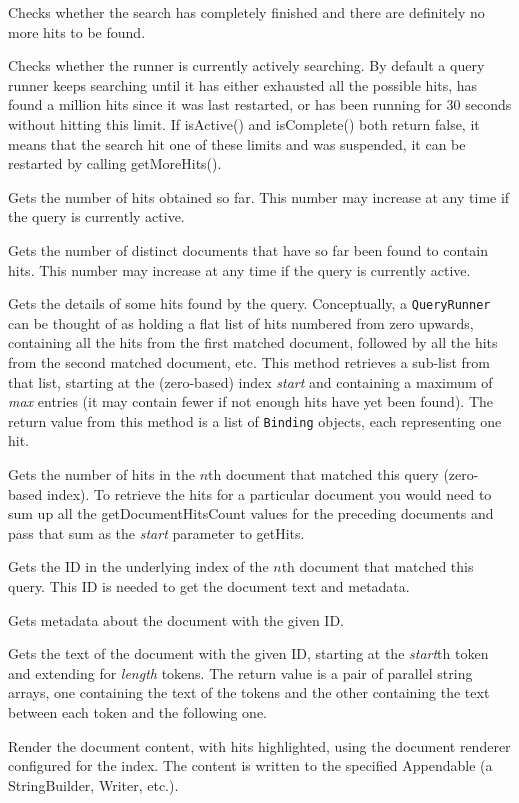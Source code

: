 \bde
\item[isComplete()] Checks whether the search has completely finished and there
  are definitely no more hits to be found.
\item[isActive()] Checks whether the runner is currently actively searching.
  By default a query runner keeps searching until it has either exhausted all
  the possible hits, has found a million hits since it was last restarted, or
  has been running for 30 seconds without hitting this limit.  If isActive()
  and isComplete() both return false, it means that the search hit one of these
  limits and was suspended, it can be restarted by calling getMoreHits().
\item[getHitsCount()] Gets the number of hits obtained so far. This number may
  increase at any time if the query is currently active.
\item[getDocumentsCount()] Gets the number of distinct documents that have so
  far been found to contain hits.  This number may increase at any time if the
  query is currently active.
\item[getHits(start, max)] Gets the details of some hits found by the query.
  Conceptually, a {\tt QueryRunner} can be thought of as holding a flat list of
  hits numbered from zero upwards, containing all the hits from the first
  matched document, followed by all the hits from the second matched document,
  etc.  This method retrieves a sub-list from that list, starting at the
  (zero-based) index {\em start} and containing a maximum of {\em max} entries
  (it may contain fewer if not enough hits have yet been found).  The return
  value from this method is a list of {\tt Binding} objects, each representing
  one hit.
\item[getDocumentHitsCount(documentIndex)] Gets the number of hits in the $n$th
  document that matched this query (zero-based index).  To retrieve the hits
  for a particular document you would need to sum up all the
  getDocumentHitsCount values for the preceding documents and pass that sum as
  the {\em start} parameter to getHits.
\item[getDocumentID(documentIndex)] Gets the ID in the underlying index of the
  $n$th document that matched this query.  This ID is needed to get the
  document text and metadata.
\item[getDocumentTitle/URI(id)] Gets metadata about the document with the given
  ID.
\item[getDocumentText(id, start, length)] Gets the text of the document with
  the given ID, starting at the {\em start}th token and extending for
  {\em length} tokens.  The return value is a pair of parallel string arrays,
  one containing the text of the tokens and the other containing the text
  between each token and the following one.
\item[renderDocument(id, Appendable)] Render the document content, with hits
  highlighted, using the document renderer configured for the index.  The
  content is written to the specified Appendable (a StringBuilder, Writer,
  etc.).
\ede

